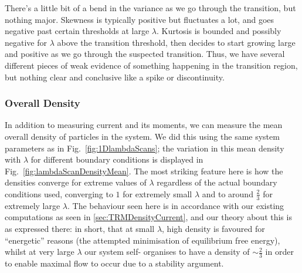 There's a little bit of a bend in the variance as we go through the transition, but nothing major.
Skewness is typically positive but fluctuates a lot, and goes negative past certain thresholds at
large $\lambda$. Kurtosis is bounded and possibly negative for $\lambda$ above the transition threshold,
then decides to start growing large and positive as we go through the suspected transition.
Thus, we have several different pieces of weak evidence of something happening in the transition region,
but nothing clear and conclusive like a spike or discontinuity.


\subsubsection{Overall Density}

In addition to measuring current and its moments, we can measure the mean overall density of particles in
the system. We did this using the same system parameters as in Fig.~\ref{fig:1DlambdaScans}; the 
variation in this mean density with $\lambda$ for different boundary conditions is displayed in 
Fig.~\ref{fig:lambdaScanDensityMean}.
The most striking feature here is how the densities converge for extreme values of $\lambda$
regardless of the actual boundary conditions used, converging to $1$ for extremely small $\lambda$ and to
around $\frac{2}{3}$ for extremely large $\lambda$. The behaviour seen here is in accordance with our 
existing computations as seen in \ref{sec:TRMDensityCurrent}, and our theory about this is as expressed 
there: in short, that at small $\lambda$, high density is favoured for ``energetic'' reasons (the
attempted minimisation of equilibrium  free energy), whilst at very large $\lambda$  our system self-
organises to have a density of $\sim \frac{2}{3}$ in order to enable maximal flow to occur due to a
stability argument.

